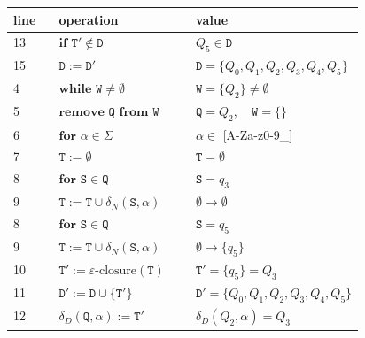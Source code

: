\documentclass{article}
\begin{document}
\begin{minipage}[c]{0.59\textwidth}
\scriptsize
\setlength{\tabcolsep}{2pt}
\renewcommand{\arraystretch}{1.45}
\begin{tabular}{@{}p{0.13\linewidth}|p{0.39\linewidth}|p{}@{}}
\textbf{line} & \textbf{operation} & \textbf{value} \\
\hline
13 & \(\textbf{if }\mathtt{T}'\notin\mathtt{D}\) & \(Q_5\in\mathtt{D}\) \\
15 & \(\mathtt{D} := \mathtt{D}'\) & \(\mathtt{D}=\{Q_0,Q_1,Q_2,Q_3,Q_4,Q_5\}\) \\
4 & \(\textbf{while }\mathtt{W}\ne\emptyset\) & \(\mathtt{W}=\{Q_2\}\ne\emptyset\) \\
5 & \(\textbf{remove }\mathtt{Q}\textbf{ from }\mathtt{W}\) & \(\mathtt{Q}=Q_2,\quad \mathtt{W}=\{\}\) \\
6 & \(\textbf{for }\alpha\in\Sigma\) & \(\alpha\in\) [A-Za-z0-9\_] \\
7 & \(\mathtt{T} := \emptyset\) & \(\mathtt{T}=\emptyset\) \\
8 & \(\textbf{for }\mathtt{S}\in\mathtt{Q}\) & \(\mathtt{S}=q_3\) \\
9 & \(\mathtt{T} := \mathtt{T}\cup\delta_N(\mathtt{S},\alpha)\) & \(\emptyset\to\emptyset\) \\
8 & \(\textbf{for }\mathtt{S}\in\mathtt{Q}\) & \(\mathtt{S}=q_5\) \\
9 & \(\mathtt{T} := \mathtt{T}\cup\delta_N(\mathtt{S},\alpha)\) & \(\emptyset\to\{q_5\}\) \\
10 & \(\mathtt{T}' := \varepsilon\mbox{-closure}(\mathtt{T})\) & \(\mathtt{T}'=\{q_5\}=Q_3\) \\
11 & \(\mathtt{D}' := \mathtt{D}\cup\{\mathtt{T}'\}\) & \(\mathtt{D}'=\{Q_0,Q_1,Q_2,Q_3,Q_4,Q_5\}\) \\
12 & \(\delta_D(\mathtt{Q},\alpha) := \mathtt{T}'\) & \(\delta_D(Q_2,\alpha)=Q_3\) \\
\end{tabular}
\end{minipage}\hfill%
\end{document}
